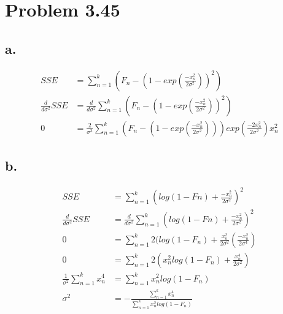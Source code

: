 \documentclass[12pt]{article}
\begin{document}
\section*{Problem 3.45}
\subsection*{a.}
\begin{align*}
  SSE &= \sum_{n=1}^k \left( F_n - (1 - exp(\frac{-x_n^2}{2\sigma^2}))^2 \right) \\
  \frac{d}{d\sigma^2}SSE &= \frac{d}{d\sigma^2}\sum_{n=1}^k \left( F_n - (1 - exp(\frac{-x_n^2}{2\sigma^2}))^2 \right) \\
  0 &= \frac{2}{\sigma^3}\sum_{n=1}^k \left( F_n - (1 - exp(\frac{-x_n^2}{2\sigma^2}))\right)exp(\frac{-2x_n^2}{2\sigma^2})x_n^2
\end{align*}

\subsection*{b.}
\begin{align*}
  SSE &= \sum_{n=1}^k \left( log(1-Fn) + \frac{-x_n^2}{2\sigma^2} \right)^2 \\
  \frac{d}{d\sigma^2}SSE &= \frac{d}{d\sigma^2} \sum_{n=1}^k \left( log(1-Fn) + \frac{-x_n^2}{2\sigma^2} \right)^2 \\
  0 &= \sum_{n=1}^k 2(log(1-F_n) + \frac{x_n^2}{2\sigma^2}(\frac{-x_n^2}{2\sigma^4}) \\
  0 &= \sum_{n=1}^k 2(x_n^2 log(1-F_n) + \frac{x_n^4}{2\sigma^2}) \\
  \frac{1}{\sigma^2} \sum_{n=1}^k x_n^4 &= \sum_{n=1}^k x_n^2 log(1-F_n) \\
  \sigma^2 &= -\frac{\sum_{n=1}^k x_n^4}{\sum_{n=1}^k x_n^2 log(1-F_n)}
\end{align*}
\end{document}
